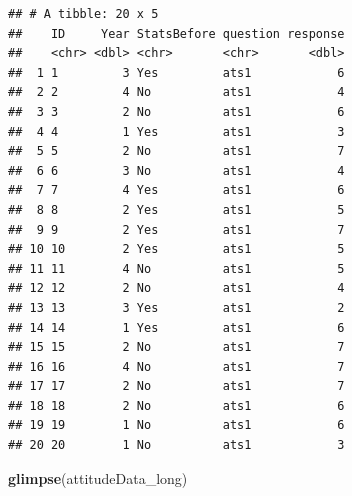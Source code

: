 \documentclass[12pt,]{book}
\newenvironment{Shaded}{\begin{snugshade}}{\end{snugshade}}
\newcommand{\CommentTok}[1]{\textcolor[rgb]{0.56,0.35,0.01}{\textit{#1}}}
\newcommand{\DataTypeTok}[1]{\textcolor[rgb]{0.13,0.29,0.53}{#1}}
\newcommand{\DecValTok}[1]{\textcolor[rgb]{0.00,0.00,0.81}{#1}}
\newcommand{\KeywordTok}[1]{\textcolor[rgb]{0.13,0.29,0.53}{\textbf{#1}}}
\newcommand{\NormalTok}[1]{#1}
\newcommand{\OperatorTok}[1]{\textcolor[rgb]{0.81,0.36,0.00}{\textbf{#1}}}
\newcommand{\StringTok}[1]{\textcolor[rgb]{0.31,0.60,0.02}{#1}}
\begin{document}
\begin{Shaded}
\end{Shaded}

\begin{verbatim}
## # A tibble: 20 x 5
##    ID     Year StatsBefore question response
##    <chr> <dbl> <chr>       <chr>       <dbl>
##  1 1         3 Yes         ats1            6
##  2 2         4 No          ats1            4
##  3 3         2 No          ats1            6
##  4 4         1 Yes         ats1            3
##  5 5         2 No          ats1            7
##  6 6         3 No          ats1            4
##  7 7         4 Yes         ats1            6
##  8 8         2 Yes         ats1            5
##  9 9         2 Yes         ats1            7
## 10 10        2 Yes         ats1            5
## 11 11        4 No          ats1            5
## 12 12        2 No          ats1            4
## 13 13        3 Yes         ats1            2
## 14 14        1 Yes         ats1            6
## 15 15        2 No          ats1            7
## 16 16        4 No          ats1            7
## 17 17        2 No          ats1            7
## 18 18        2 No          ats1            6
## 19 19        1 No          ats1            6
## 20 20        1 No          ats1            3
\end{verbatim}

\begin{Shaded}
\begin{Highlighting}[]
\KeywordTok{glimpse}\NormalTok{(attitudeData_long)}
\end{Highlighting}
\end{Shaded}
\end{document}
